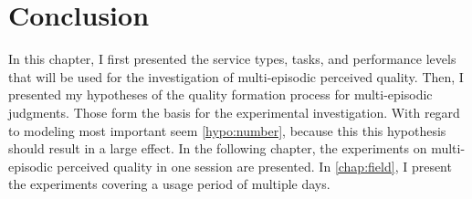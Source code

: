 \section{Conclusion}
In this chapter, I first presented the service types, tasks, and performance levels that will be used for the investigation of multi-episodic perceived quality.
Then, I presented my hypotheses of the quality formation process for multi-episodic judgments.
Those form the basis for the experimental investigation.
With regard to modeling most important seem \autoref{hypo:number}, because this this hypothesis should result in a large effect.
In the following chapter, the experiments on multi-episodic perceived quality in one session are presented.
In \autoref{chap:field}, I present the experiments covering a usage period of multiple days. 
